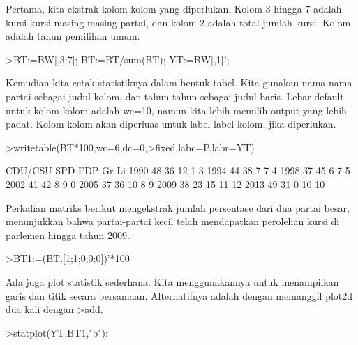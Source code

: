 \documentclass[a4paper,10pt]{article}
\begin{document}
\begin{eulernotebook}
\begin{eulercomment}
Pertama, kita ekstrak kolom-kolom yang diperlukan. Kolom 3 hingga 7
adalah kursi-kursi masing-masing partai, dan kolom 2 adalah total
jumlah kursi. Kolom adalah tahun pemilihan umum.
\end{eulercomment}
\begin{eulerprompt}
>BT:=BW[,3:7]; BT:=BT/sum(BT); YT:=BW[,1]';
\end{eulerprompt}
\begin{eulercomment}
Kemudian kita cetak statistiknya dalam bentuk tabel. Kita gunakan
nama-nama partai sebagai judul kolom, dan tahun-tahun sebagai judul
baris. Lebar default untuk kolom-kolom adalah wc=10, namun kita lebih
memilih output yang lebih padat. Kolom-kolom akan diperluas untuk
label-label kolom, jika diperlukan.
\end{eulercomment}
\begin{eulerprompt}
>writetable(BT*100,wc=6,dc=0,>fixed,labc=P,labr=YT)
\end{eulerprompt}
\begin{euleroutput}
         CDU/CSU   SPD   FDP    Gr    Li
    1990      48    36    12     1     3
    1994      44    38     7     7     4
    1998      37    45     6     7     5
    2002      41    42     8     9     0
    2005      37    36    10     8     9
    2009      38    23    15    11    12
    2013      49    31     0    10    10
\end{euleroutput}
\begin{eulercomment}
Perkalian matriks berikut mengekstrak jumlah persentase dari dua
partai besar, menunjukkan bahwa partai-partai kecil telah mendapatkan
perolehan kursi di parlemen hingga tahun 2009.
\end{eulercomment}
\begin{eulerprompt}
>BT1:=(BT.[1;1;0;0;0])'*100
\end{eulerprompt}
\begin{euleroutput}
  [84.29,  81.25,  81.1659,  82.7529,  72.9642,  61.8971,  79.8732]
\end{euleroutput}
\begin{eulercomment}
Ada juga plot statistik sederhana. Kita menggunakannya untuk
menampilkan garis dan titik secara bersamaan. Alternatifnya adalah
dengan memanggil plot2d dua kali dengan \textgreater{}add.
\end{eulercomment}
\begin{eulerprompt}
>statplot(YT,BT1,"b"):
\end{eulerprompt}

\end{eulernotebook}
\end{document}
